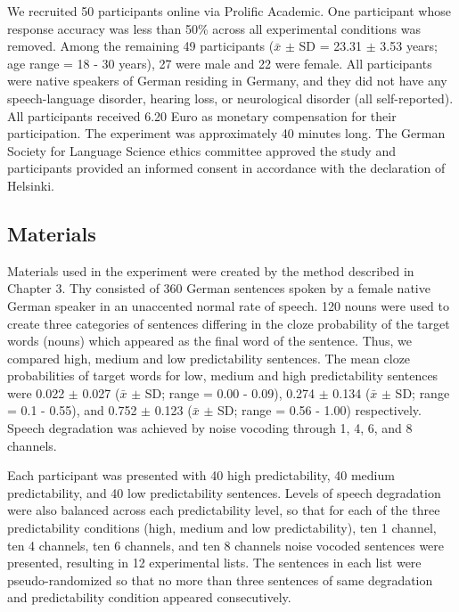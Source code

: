 \documentclass[a4paper, nobind]{templates/ociamthesis}
\begin{document}
We recruited 50 participants online via Prolific Academic.
One participant whose response accuracy was less than 50\% across all experimental conditions was removed.
Among the remaining 49 participants (\(\bar{x}\) \(\pm\) SD = 23.31 \(\pm\) 3.53 years; age range = 18 - 30 years), 27 were male and 22 were female.
All participants were native speakers of German residing in Germany, and they did not have any speech-language disorder, hearing loss, or neurological disorder (all self-reported).
All participants received 6.20 Euro as monetary compensation for their participation.
The experiment was approximately 40 minutes long.
The German Society for Language Science ethics committee approved the study and participants provided an informed consent in accordance with the declaration of Helsinki.

\hypertarget{materials}{%
\subsection{Materials}\label{materials}}

Materials used in the experiment were created by the method described in Chapter 3.
Thy consisted of 360 German sentences spoken by a female native German speaker in an unaccented normal rate of speech.
120 nouns were used to create three categories of sentences differing in the cloze probability of the target words (nouns) which appeared as the final word of the sentence.
Thus, we compared high, medium and low predictability sentences.
The mean cloze probabilities of target words for low, medium and high predictability sentences were 0.022 \(\pm\) 0.027 (\(\bar{x}\) \(\pm\) SD; range = 0.00 - 0.09), 0.274 \(\pm\) 0.134 (\(\bar{x}\) \(\pm\) SD; range = 0.1 - 0.55), and 0.752 \(\pm\) 0.123 (\(\bar{x}\) \(\pm\) SD; range = 0.56 - 1.00) respectively.
Speech degradation was achieved by noise vocoding through 1, 4, 6, and 8 channels.

Each participant was presented with 40 high predictability, 40 medium predictability, and 40 low predictability sentences.
Levels of speech degradation were also balanced across each predictability level, so that for each of the three predictability conditions (high, medium and low predictability), ten 1 channel, ten 4 channels, ten 6 channels, and ten 8 channels noise vocoded sentences were presented, resulting in 12 experimental lists.
The sentences in each list were pseudo-randomized so that no more than three sentences of same degradation and predictability condition appeared consecutively.
\end{document}
